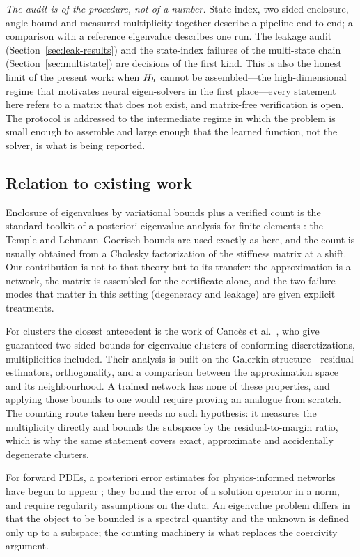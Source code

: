 \emph{The audit is of the procedure, not of a number.} State index, two-sided
enclosure, angle bound and measured multiplicity together describe a pipeline
end to end; a comparison with a reference eigenvalue describes one run. The
leakage audit (Section~\ref{sec:leak-results}) and the state-index failures of
the multi-state chain (Section~\ref{sec:multistate}) are decisions of the
first kind. This is also the honest limit of the present work: when $H_h$
cannot be assembled---the high-dimensional regime that motivates neural
eigen-solvers in the first place---every statement here refers to a matrix
that does not exist, and matrix-free verification is open. The protocol is
addressed to the intermediate regime in which the problem is small enough to
assemble and large enough that the learned function, not the solver, is what
is being reported.

\subsection{Relation to existing work}

Enclosure of eigenvalues by variational bounds plus a verified count is the
standard toolkit of a posteriori eigenvalue analysis for finite elements
\citep{babuska1991}: the Temple and Lehmann--Goerisch bounds are used exactly
as here, and the count is usually obtained from a Cholesky factorization of
the stiffness matrix at a shift. Our contribution is not to that theory but to
its transfer: the approximation is a network, the matrix is assembled for the
certificate alone, and the two failure modes that matter in this setting
(degeneracy and leakage) are given explicit treatments.

For clusters the closest antecedent is the work of Canc\`es et al.~\cite{cances2020}, who give
guaranteed two-sided bounds for eigenvalue clusters of conforming
discretizations, multiplicities included. Their analysis is built on the
Galerkin structure---residual estimators, orthogonality, and a comparison
between the approximation space and its neighbourhood. A trained network has
none of these properties, and applying those bounds to one would require
proving an analogue from scratch.
The counting route taken here needs no such hypothesis: it measures the
multiplicity directly and bounds the subspace by the residual-to-margin
ratio, which is why the same statement covers exact, approximate and
accidentally degenerate clusters.

For forward PDEs, a posteriori error estimates for physics-informed networks
have begun to appear \citep{mishra2023}; they bound the error of a solution
operator in a norm, and require regularity assumptions on the data. An
eigenvalue problem differs in that the object to be bounded is a spectral
quantity and the unknown is defined only up to a subspace; the counting
machinery is what replaces the coercivity argument.

